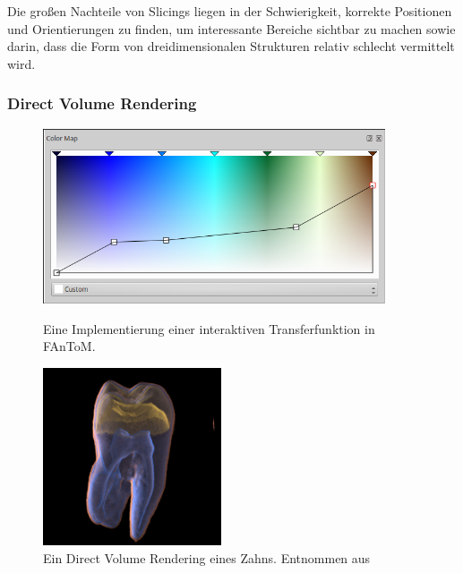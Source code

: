 \documentclass[a4paper,fontsize=12pt,toc=bib,halfparskip,ngerman]{scrartcl}
\begin{document}
Die gro{\ss}en Nachteile von Slicings liegen in der Schwierigkeit, korrekte Positionen und Orientierungen zu finden, um interessante Bereiche sichtbar zu machen sowie darin, dass die Form von dreidimensionalen Strukturen relativ schlecht vermittelt wird. 

\subsubsection{Direct Volume Rendering}
\label{sec:DVR}
\begin{figure}
	\begin{minipage}{0.5\textwidth}
		\centering
		\includegraphics[width=0.9\textwidth]{pictures/Colormap.png}
		\caption{Eine Implementierung einer interaktiven Transferfunktion in FAnToM.} 
		\label{Colormap}
	\end{minipage}
	\hspace{0.5cm}
	\begin{minipage}{0.5\textwidth}
		\centering
		\includegraphics[width=0.47\textwidth]{pictures/Zahn.png}
		\caption{Ein Direct Volume Rendering eines Zahns. Entnommen aus \cite[S.~6]{drebin1988volume}}
		\label{Zahn}
	\end{minipage}
\end{figure}
\end{document}
